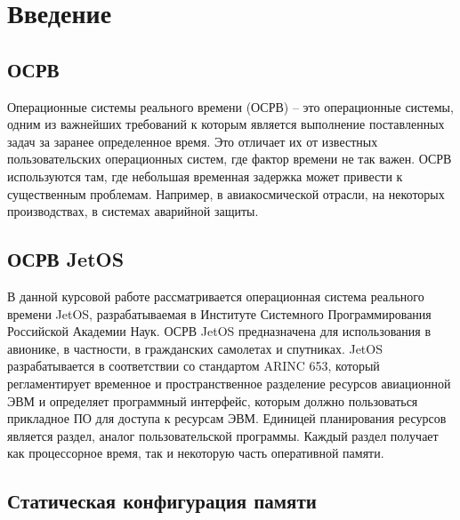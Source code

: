 \documentclass[oneside,senior,etd]{BYUPhys}
\begin{document}
\fixmargins
 \makepreliminarypages

\oneandhalfspace

\newenvironment{compactlist}{
  \begin{list}{{$\bullet$}}{
  \setlength\partopsep{0pt}
  \setlength\parskip{0pt}
  \setlength\parsep{10pt}
  \setlength\topsep{8pt}
  \setlength\itemsep{0pt}
  }
  }{
  \end{list}
}

\tableofcontents

\section{Введение}

\subsection{ОСРВ}

Операционные системы реального времени (ОСРВ) -- это операционные системы, одним из важнейших
требований к которым является выполнение поставленных задач за заранее определенное время.
Это отличает их от известных пользовательских операционных систем, где фактор времени не так
важен. ОСРВ используются там, где небольшая временная задержка может привести к существенным
проблемам. Например, в авиакосмической отрасли, на некоторых производствах, в системах
аварийной защиты.

\subsection{ОСРВ JetOS}

В данной курсовой работе рассматривается операционная система реального времени JetOS, разрабатываемая
в Институте Системного Программирования Российской Академии Наук. ОСРВ JetOS предназначена для
использования в авионике, в частности, в гражданских самолетах и спутниках. JetOS разрабатывается
в соответствии со стандартом ARINC 653, который регламентирует временное и пространственное
разделение ресурсов авиационной ЭВМ и определяет программный интерфейс, которым должно
пользоваться прикладное ПО для доступа к ресурсам ЭВМ. Единицей планирования ресурсов является
раздел, аналог пользовательской программы. Каждый раздел получает как процессорное время, 
так и некоторую часть оперативной памяти.

\subsection{Статическая конфигурация памяти}
\end{document}
